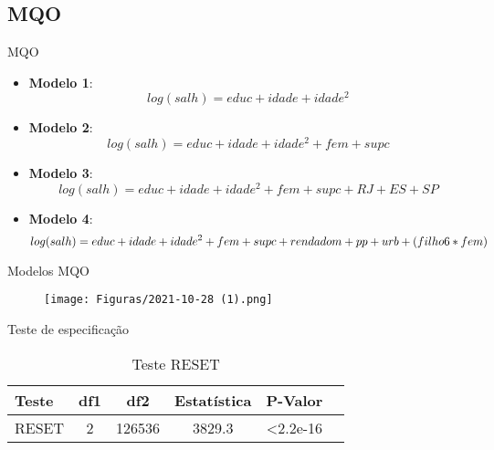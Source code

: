 \documentclass[xcolor={dvipsnames}]{beamer}
\begin{document}
\subsection{MQO}
\begin{frame}{MQO}
    \begin{itemize}
    \item \textbf{Modelo 1}:
    \begin{equation}
        log(salh) = educ +idade + idade^2  
    \end{equation} 
    \item \textbf{Modelo 2}:
    \begin{equation}
        log(salh) = educ +idade + idade^2 + fem + supc
    \end{equation} 
    \item \textbf{Modelo 3}:
    \begin{equation}
        log(salh) = educ +idade + idade^2 + fem + supc +RJ+ES+SP
    \end{equation} 
    \item \textbf{Modelo 4}:
    \begin{equation}
        log(salh) = educ +idade + idade^2 + fem + supc +rendadom+pp\\+urb+(filho6*fem)
    \end{equation}
    \end{itemize}
\end{frame}


\begin{frame}{Modelos MQO}
    \begin{figure}
        \centering
        \texttt{[image: Figuras/2021-10-28 (1).png]}
    \end{figure}
\end{frame}

\begin{frame}{Teste de especificação}
 \begin{table}[H]
    \caption{Teste RESET}
    \centering
    \begin{tabular}{lccccc}\hline
    \textbf{Teste}     & df1 & df2   & Estatística & P-Valor \\\hline
    RESET & 2   & 126536 & 3829.3     & <2.2e-16\\\hline
 \end{tabular}
\end{table}
\end{frame}
\end{document}

